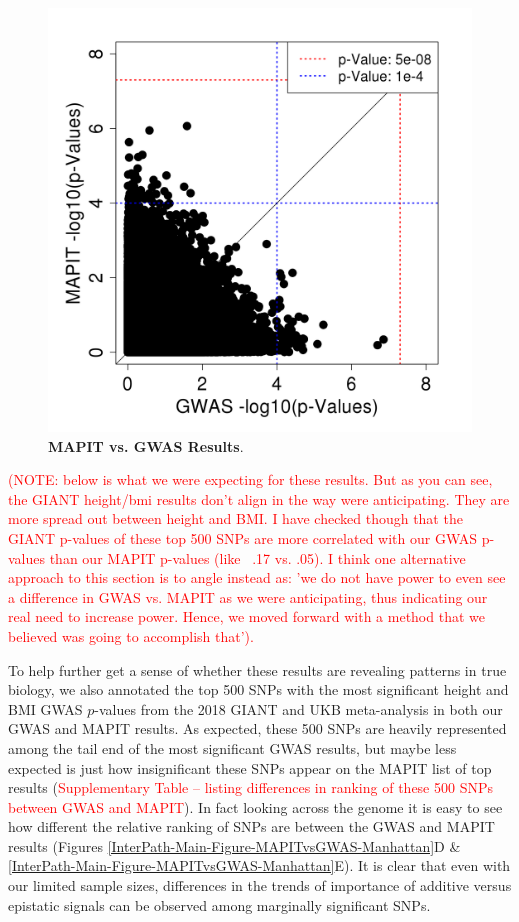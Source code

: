 \documentclass[12pt, a4paper]{article}
\begin{document}
\begin{figure}[htbp]
\centering
\includegraphics[scale=.35]{Images/Main/InterPath_Main_Figure_MAPITvsGWAS_vs2_AfrHght.png}
\caption[TBD]{\textbf{MAPIT vs. GWAS Results}.}
\label{InterPath-Main-Figure-MAPITvsGWAS-AfrHght}
\end{figure}

\textcolor{red}{(NOTE: below is what we were expecting for these results. But as you can see, the GIANT height/bmi results don't align in the way were anticipating. They are more spread out between height and BMI. I have checked though that the GIANT p-values of these top 500 SNPs are more correlated with our GWAS p-values than our MAPIT p-values (like ~.17 vs. .05). 
I think one alternative approach to this section is to angle instead as: 'we do not have power to even see a difference in GWAS vs. MAPIT as we were anticipating, thus indicating our real need to increase power. Hence, we moved forward with a method that we believed was going to accomplish that').}

To help further get a sense of whether these results are revealing patterns in true biology, we also annotated the top 500 SNPs with the most significant height and BMI GWAS $p$-values from the 2018 GIANT and UKB meta-analysis \cite{Yengo2018} in both our GWAS and MAPIT results. As expected, these 500 SNPs are heavily represented among the tail end of the most significant GWAS results, but maybe less expected is just how insignificant these SNPs appear on the MAPIT list of top results (\textcolor{red}{Supplementary Table -- listing differences in ranking of these 500 SNPs between GWAS and MAPIT}). In fact looking across the genome it is easy to see how different the relative ranking of SNPs are between the GWAS and MAPIT results (Figures \ref{InterPath-Main-Figure-MAPITvsGWAS-Manhattan}D \& \ref{InterPath-Main-Figure-MAPITvsGWAS-Manhattan}E). It is clear that even with our limited sample sizes, differences in the trends of importance of additive versus epistatic signals can be observed among marginally significant SNPs.  
\end{document}
